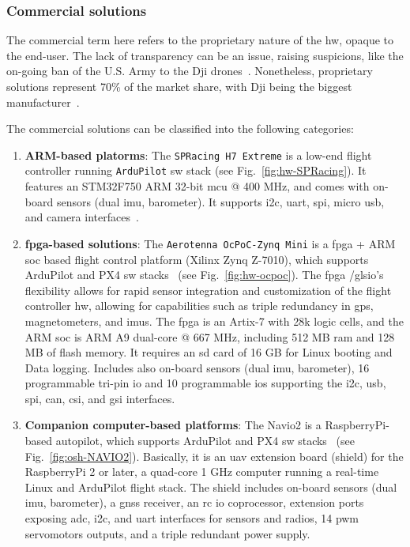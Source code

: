 \subsubsection{Commercial solutions}%
\label{sec:commercial-solutions-hw}
The commercial term here refers to the proprietary nature of the \gls{hw},
opaque to the end-user. The
lack of transparency can be an issue, raising suspicions, like the on-going ban
of the U.S. Army to the Dji
drones~\cite{suasNewsDjiDronesBanned2017,djiBan2022}. Nonetheless, proprietary
solutions represent 70\% of the market share, with Dji being the biggest
manufacturer~\cite{droneAnalyst2021}.

The commercial solutions can be classified into the following categories:
\begin{enumerate}
\item \textbf{ARM-based platorms}: The \texttt{SPRacing H7 Extreme} is a low-end
  flight controller running \texttt{ArduPilot} \gls{sw} stack (see Fig.~\ref{fig:hw-SPRacing}). It features 
  an STM32F750 ARM 32-bit \gls{mcu} @ 400 MHz, and comes with on-board sensors
  (dual \gls{imu}, barometer). It supports \gls{i2c}, \gls{uart}, \gls{spi},
  micro \gls{usb}, and camera interfaces~\cite{arduPilot-SPRacing}.
%  
\item \textbf{\gls{fpga}-based solutions}:
  The \texttt{Aerotenna OcPoC-Zynq Mini} is a \gls{fpga} + ARM \gls{soc} based
  flight control platform (Xilinx Zynq Z-7010),  which supports ArduPilot and PX4 \gls{sw}
  stacks~\cite{ocpoc} (see Fig.~\ref{fig:hw-ocpoc}).
  The \gls{fpga} /gls{io}'s flexibility allows for rapid sensor integration and
  customization of the flight controller \gls{hw}, allowing for capabilities
  such as triple redundancy in \gls{gps}, magnetometers, and \glspl{imu}.
  The \gls{fpga} is an Artix-7 with 28k logic cells, and the ARM \gls{soc} is
  ARM A9 dual-core @ 667 MHz, including 512 MB \gls{ram} and 128 MB of flash
  memory. It requires an \gls{sd} card of 16 GB for Linux booting and Data
  logging.
  Includes also on-board
  sensors (dual \gls{imu}, barometer), 16 programmable tri-pin \gls{io} and 
  10 programmable \glspl{io} supporting the \gls{i2c}, \gls{usb}, \gls{spi},
  \gls{can}, \gls{csi}, and \gls{gsi} interfaces.
%  
\item \textbf{Companion computer-based platforms}: The Navio2 is a RaspberryPi-based
  autopilot, which supports ArduPilot and PX4 \gls{sw}
  stacks~\cite{arduPilot-Navio2} (see Fig.~\ref{fig:osh-NAVIO2}). Basically, it is an \gls{uav} extension board
  (shield) for the RaspberryPi 2 or later, a quad-core 1 GHz computer running a
  real-time Linux and ArduPilot flight stack. The shield includes on-board
  sensors (dual \gls{imu}, barometer), a \gls{gnss} receiver, an \gls{rc}
  \gls{io} coprocessor, extension ports exposing \gls{adc}, \gls{i2c}, and
  \gls{uart} interfaces for sensors and radios, 14 \gls{pwm} servomotors
  outputs, and a triple redundant power supply.


\end{enumerate}
